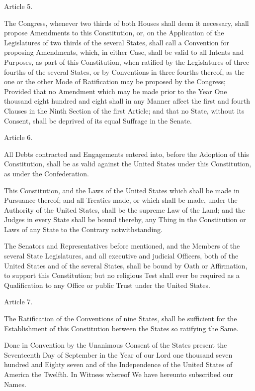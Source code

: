 \documentclass{article}
\begin{document}
Article 5.

The Congress, whenever two thirds of both Houses shall deem it necessary, shall
propose Amendments to this Constitution, or, on the Application of the
Legislatures of two thirds of the several States, shall call a Convention for
proposing Amendments, which, in either Case, shall be valid to all Intents and
Purposes, as part of this Constitution, when ratified by the Legislatures of
three fourths of the several States, or by Conventions in three fourths
thereof, as the one or the other Mode of Ratification may be proposed by the
Congress; Provided that no Amendment which may be made prior to the Year One
thousand eight hundred and eight shall in any Manner affect the first and
fourth Clauses in the Ninth Section of the first Article; and that no State,
without its Consent, shall be deprived of its equal Suffrage in the Senate.

Article 6.

All Debts contracted and Engagements entered into, before the Adoption of this
Constitution, shall be as valid against the United States under this
Constitution, as under the Confederation.

This Constitution, and the Laws of the United States which shall be made in
Pursuance thereof; and all Treaties made, or which shall be made, under the
Authority of the United States, shall be the supreme Law of the Land; and the
Judges in every State shall be bound thereby, any Thing in the Constitution or
Laws of any State to the Contrary notwithstanding.

The Senators and Representatives before mentioned, and the Members of the
several State Legislatures, and all executive and judicial Officers, both of
the United States and of the several States, shall be bound by Oath or
Affirmation, to support this Constitution; but no religious Test shall ever be
required as a Qualification to any Office or public Trust under the United
States.

Article 7.

The Ratification of the Conventions of nine States, shall be sufficient for the
Establishment of this Constitution between the States so ratifying the Same.

Done in Convention by the Unanimous Consent of the States present the
Seventeenth Day of September in the Year of our Lord one thousand seven hundred
and Eighty seven and of the Independence of the United States of America the
Twelfth. In Witness whereof We have hereunto subscribed our Names.
\end{document}

